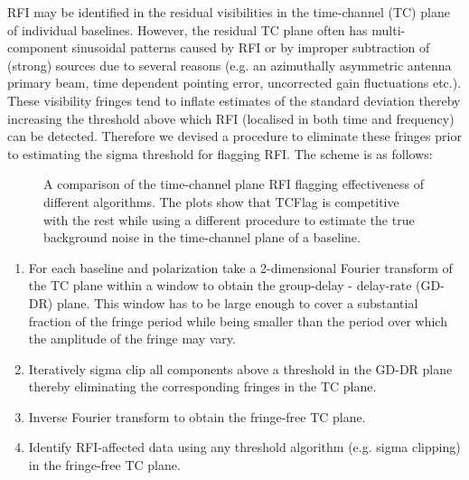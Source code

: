 \documentclass[twocolumn]{aastex61}
\begin{document}
{RFI may be identified in the residual visibilities in the time-channel (TC)
plane of individual baselines.  However, the residual TC plane often has
multi-component sinusoidal patterns caused by RFI or by improper subtraction of
(strong) sources due to several reasons (e.g.  an azimuthally asymmetric antenna
primary beam, time dependent pointing error, uncorrected gain fluctuations
etc.). These visibility fringes tend to inflate estimates of the standard
deviation thereby increasing the threshold above which RFI (localised in both
time and frequency) can be detected.  Therefore we devised a procedure to
eliminate these fringes prior to estimating the sigma threshold for flagging
RFI. The scheme is as follows:

\begin{figure*}
\caption{A comparison of the time-channel plane RFI flagging effectiveness of
different algorithms. The plots show that TCFlag is competitive with the rest
while using a different procedure to estimate the true background noise in the
time-channel plane of a baseline.}
\label{fig:tc_rms_plots}
\end{figure*}

\begin{enumerate}

   \item For each baseline and polarization take a 2-dimensional Fourier
      transform of the TC plane within a window to obtain the group-delay
      - delay-rate (GD-DR) plane. This window has to be large enough to cover
      a substantial fraction of the fringe period while being smaller than the
      period over which the amplitude of the fringe may vary.

   \item Iteratively sigma clip all components above a threshold in the
      GD-DR plane thereby eliminating the corresponding fringes in the TC
      plane.

   \item Inverse Fourier transform to obtain the fringe-free TC plane.

   \item Identify RFI-affected data using any threshold algorithm (e.g. sigma
      clipping) in the fringe-free TC plane.


\end{enumerate}}
\end{document}
